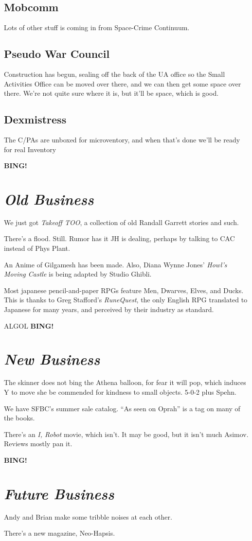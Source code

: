 \documentclass[10pt]{article}
\newcommand{\bing}{{\bf BING!} }
\newcommand{\goto}[1]{\bing \vskip 12pt \section*{{\em{#1}}}}
\newcommand{\ps}{ plus Spehn\xspace}
\begin{document}
\subsection*{Mobcomm}
Lots of other stuff is coming in from Space-Crime Continuum.

\subsection*{Pseudo War Council}
Construction has begun, sealing off the back of the UA office so the
Small Activities Office can be moved over there, and we can then get
some space over there.  We're not quite sure where it is, but it'll be
space, which is good.

\subsection*{Dexmistress}
The C/PAs are unboxed for microventory,  and when that's done we'll be
ready for real Inventory 

\goto{Old Business}

We just got \emph{Takeoff TOO}, a collection of old Randall Garrett
stories and such.

There's a flood.  Still.  Rumor has it JH is dealing, perhaps by
talking to CAC instead of Phys Plant.

An Anime of Gilgamesh has been made.  Also, Diana Wynne Jones'
\emph{Howl's Moving Castle} is being adapted by Studio Ghibli.

Most japanese pencil-and-paper RPGs feature Men, Dwarves, Elves, and
Ducks.  This is thanks to Greg Stafford's \emph{RuneQuest}, the only
English RPG translated to Japanese for many years, and perceived by
their industry as standard.

ALGOL
\goto{New Business}

The skinner does not bing the Athena balloon, for fear it will pop,
which induces Y to move she be commended for kindness to small
objects. 5-0-2\ps.

We have SFBC's summer sale catalog.  ``As seen on Oprah'' is a tag on
many of the books.

There's an \emph{I, Robot} movie, which isn't.  It may be good, but it
isn't much Asimov.  Reviews mostly pan it.

\goto{Future Business}

Andy and Brian make some tribble noises at each other.

There's a new magazine, Neo-Hapsis.
\end{document}
